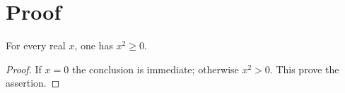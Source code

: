 \section{Proof}\label{sec:proof}
\begin{lemma}\label{lem:positive}
For every real $x$, one has $x^2\ge0$.
\end{lemma}
\begin{proof}
If $x=0$ the conclusion is immediate; otherwise $x^2>0$.
This prove the assertion.
\end{proof}
